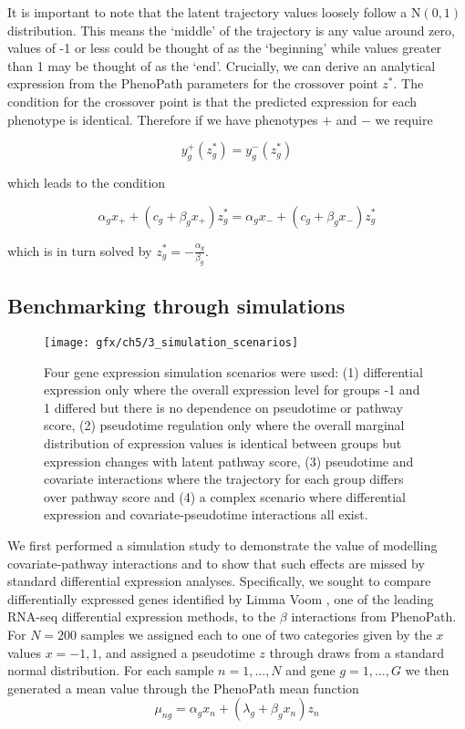 It is important to note that the latent trajectory values loosely follow a $\text{N}(0, 1)$ distribution. This means the `middle' of the trajectory is any value around zero, values of -1 or less could be thought of as the `beginning' while values greater than 1 may be thought of as the `end'. Crucially, we can derive an analytical expression from the PhenoPath parameters for the crossover point $z^*$. The condition for the crossover point is that the predicted expression for each phenotype is identical. Therefore if we have phenotypes $+$ and $-$ we require

\begin{equation}
  y_g^{+}(z_g^*) = y_g^{-}(z_g^*)
\end{equation}

which leads to the condition

\begin{equation}
  \alpha_g x_{+} + \left( c_g + \beta_g x_{+}\right) z^*_g =
  \alpha_g x_{-} + \left( c_g + \beta_g x_{-}\right) z^*_g
\end{equation}

which is in turn solved by $
  z^*_g = -\frac{\alpha_g}{\beta_g}$.


\subsection{Benchmarking through simulations}

\begin{figure}
\centering
  \texttt{[image: gfx/ch5/3\_simulation\_scenarios]}
   \caption{Four gene expression simulation scenarios were used: (1) differential expression only where the overall expression level for groups -1 and 1 differed but there is no dependence on pseudotime or pathway score, (2) pseudotime regulation only where the overall marginal distribution of expression values is identical between groups but expression changes with latent pathway score, (3) pseudotime and covariate interactions where the trajectory for each group differs over pathway score and (4) a complex scenario where differential expression and covariate-pseudotime interactions all exist. } \label{fig:simulation_scenarios}
\end{figure}

We first performed a simulation study to demonstrate the value of modelling covariate-pathway interactions and to show that such effects are missed by standard differential expression analyses. Specifically, we sought to compare differentially expressed genes identified by Limma Voom \cite{Law2014-tu}, one of the leading RNA-seq differential expression methods, to the $\beta$ interactions from PhenoPath. For $N = 200$ samples we assigned each to one of two categories given by the $x$ values $x = -1, 1$, and assigned a pseudotime $z$ through draws from a standard normal distribution. For each sample $n = 1, \ldots, N$ and gene $g = 1, \ldots, G$ we then generated a mean value through the PhenoPath mean function
\begin{equation}
  \mu_{ng} = \alpha_g x_n + (\lambda_g + \beta_g x_n) z_n
\end{equation}

